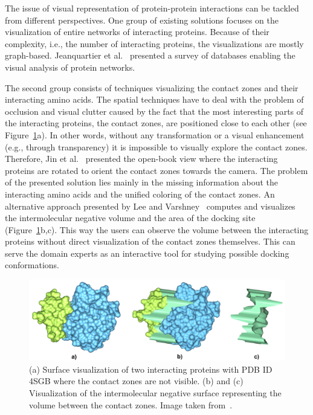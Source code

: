 \documentclass[journal]{vgtc}                %
\begin{document}
The issue of visual representation of protein-protein interactions can be tackled from different perspectives.
One group of existing solutions focuses on the visualization of entire networks of interacting proteins.
Because of their complexity, i.e., the number of interacting proteins, the visualizations are mostly graph-based.
Jeanquartier et al.~\cite{Jeanquartier2015} presented a survey of databases enabling the visual analysis of protein networks.

The second group consists of techniques visualizing the contact zones and their interacting amino acids.
The spatial techniques have to deal with the problem of occlusion and visual clutter caused by the fact that the most interesting parts of the interacting proteins, the contact zones, are positioned close to each other (see Figure~\ref{fig:varshney}a).
In other words, without any transformation or a visual enhancement (e.g., through transparency) it is impossible to visually explore the contact zones.
Therefore, Jin et al.~\cite{Jin2014} presented the open-book view where the interacting proteins are rotated to orient the contact zones towards the camera.
The problem of the presented solution lies mainly in the missing information about the interacting amino acids and the unified coloring of the contact zones.
An alternative approach presented by Lee and Varshney~\cite{Varshney2003} computes and visualizes the intermolecular negative volume and the area of the docking site (Figure~\ref{fig:varshney}b,c).
This way the users can observe the volume between the interacting proteins without direct visualization of the contact zones themselves.
This can serve the domain experts as an interactive tool for studying possible docking conformations.

\begin{figure}[bt]
  \centering
  \includegraphics[width=1.0\columnwidth]{varshney.png}
  \caption{(a) Surface visualization of two interacting proteins with PDB ID 4SGB where the contact zones are not visible. (b) and (c) Visualization of the intermolecular negative surface representing the volume between the contact zones. Image taken from~\cite{Varshney2003}.}
  \label{fig:varshney}
\end{figure}
\end{document}
